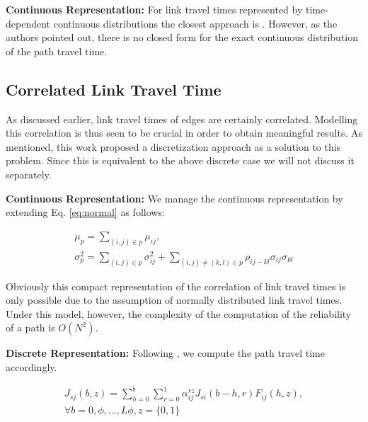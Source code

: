 \textbf{Continuous Representation: } For link travel times represented by
time-dependent continuous distributions the closest approach is
\cite{CheLamLiSumYan13}. However, as the authors pointed out, there is no closed
form for the exact continuous distribution of the path travel time.


\subsection{Correlated Link Travel Time}
\label{subsec:cor}
As discussed earlier, link travel times of edges are certainly
correlated. Modelling this correlation is thus seen to be crucial in order to
obtain meaningful results. As mentioned, this work proposed a discretization
approach as a solution to this problem.
Since this is equivalent to the above discrete case we will not discuss it
separately.

\textbf{Continuous Representation: } We manage the continuous representation by
extending Eq. \ref{eq:normal} as follows:


\begin{gather}
\label{eq:normal2}
	\mu_{p} = \sum_{(i,j)\in p} \mu_{ij}, \\
	\sigma_{p}^2 = \sum_{(i,j)\in p} \sigma_{ij}^2 +\sum_{(i,j)\neq(k,l)\in p}
	\rho_{ij-kl}
	\sigma_{ij} \sigma_{kl}
\end{gather}

Obviously this compact representation of the correlation of link travel times is
only possible due to the assumption of normally distributed link travel times.
Under this model, however, the complexity of the computation of the reliability
of a path is $O(N^2)$.

\textbf{Discrete Representation: } Following \cite{NieFan06}, we compute the
path travel time accordingly.

\begin{multline}
\label{eq:pmr3}
	J_{sj}(b,z) = \sum_{h=0}^b \sum_{r=0}^1 \alpha^{rz}_{ij} J_{si}(b-h,r)
	F_{ij}(h,z)  , \\ \forall b = 0, \phi,\ldots, L
	\phi, z = \{0, 1\}
\end{multline}

